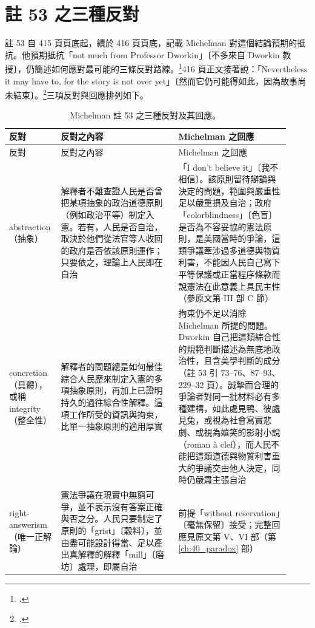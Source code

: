 \section{註 53 之三種反對}
\label{sec:30_dworkin-5}

註 53 自 415 頁頁底起，續於 416 頁頁底，記載 Michelman 對這個結論預期的抵抗。他預期抵抗「not much from Professor Dworkin」〔不多來自 Dworkin 教授〕，仍簡述如何應對最可能的三條反對路線。\footcite[415--416 n.53]{michelman1998}416 頁正文接著說：「Nevertheless it may have to, for the story is not over yet」〔然而它仍可能得如此，因為故事尚未結束〕。\footcite[416]{michelman1998}三項反對與回應排列如下。

\begin{longtable}{@{}L{0.14\linewidth}L{0.40\linewidth}L{0.38\linewidth}@{}}
\caption{Michelman 註 53 之三種反對及其回應。}\\
\toprule
反對 & 反對之內容 & Michelman 之回應 \\
\midrule
\endfirsthead
\toprule
反對 & 反對之內容 & Michelman 之回應 \\
\midrule
\endhead
abstraction（抽象） & 解釋者不難查證人民是否曾把某項抽象的政治道德原則（例如政治平等）制定入憲。若有，人民是否自治，取決於他們從法官等人收回的政府是否依該原則運作；只要依之，理論上人民即在自治 & 「I don't believe it」〔我不相信〕。該原則留待辯論與決定的問題，範圍與嚴重性足以嚴重損及自治；政府「colorblindness」〔色盲〕是否為不容妥協的憲法原則，是美國當時的爭論，這類爭議牽涉過多道德與物質利害，不能因人民自己寫下平等保護或正當程序條款而說憲法在此意義上具民主性（參原文第 III 部 C 節） \\
concretion（具體），或稱 integrity（整全性） & 解釋者的問題總是如何最佳綜合人民歷來制定入憲的多項抽象原則，再加上已證明持久的過往綜合性解釋。這項工作所受的資訊與拘束，比單一抽象原則的適用厚實 & 拘束仍不足以消除 Michelman 所提的問題。Dworkin 自己把這類綜合性的規範判斷描述為無底地政治性，且含美學判斷的成分（註 53 引  73--76、87--93、229--32 頁）。誠摯而合理的爭論者對同一批材料必有多種建構，如此處見鴨、彼處見兔，或視為社會寫實悲劇、或視為嬉笑的影射小說（roman à clef），而人民不能把這類道德與物質利害重大的爭議交由他人決定，同時仍嚴肅主張自治 \\
right-answerism（唯一正解論） & 憲法爭議在現實中無窮可爭，並不表示沒有答案正確與否之分。人民只要制定了原則的「grist」〔穀料〕，並由盡可能設計得當、足以產出真解釋的解釋「mill」〔磨坊〕處理，即屬自治 & 前提「without reservation」〔毫無保留〕接受；完整回應見原文第 V、VI 部（第 \ref{ch:40_paradox} 部） \\
\bottomrule
\end{longtable}

